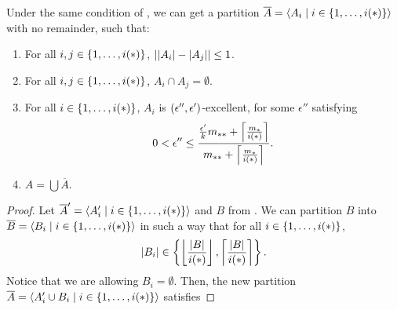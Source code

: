         \begin{lemma} \label{lem:existance_of_excellent_partition_with_equal_size_and_no_remainder}
            Under the same condition of , we can get a
            partition $\overline{A} = \left< A_i \mid i \in \{ 1, \dots, i(*) \} \right>$ with no remainder, such that:
            \begin{enumerate}[label={\Roman*}., ref={\Roman*}, font=\rmfamily]
                \item \label{itm:existance_of_excellent_partition_with_equal_size_and_no_remainder.a}
                    For all $i, j \in \{ 1, \dots, i(*) \}$, $| | A_i |- | A_j | | \leq 1$.
                \item \label{itm:existance_of_excellent_partition_with_equal_size_and_no_remainder.b}
                    For all $i, j \in \{ 1, \dots, i(*) \}$, $A_i \cap A_j = \emptyset$.
                \item \label{itm:existance_of_excellent_partition_with_equal_size_and_no_remainder.c}
                    For all $i \in \{ 1, \dots, i(*) \}$, $A_i$ is $( \epsilon'', \epsilon' )$-excellent, for some $\epsilon''$
                    satisfying
                    \[
                        0 < \epsilon'' \leq \frac{\frac{\epsilon'}{k} m_{**} + \left\lceil \frac{m_*}{i(*)} \right\rceil}{m_{**} + \left\lceil \frac{m_*}{i(*)} \right\rceil}.
                    \]
                \item \label{itm:existance_of_excellent_partition_with_equal_size_and_no_remainder.d} $A = \bigcup \overline{A}$.
            \end{enumerate}
            \begin{proof}
                Let $\overline{A}' = \left< A_i' \mid i \in \{ 1, \dots, i(*) \} \right>$ and $B$ from
                .
                \sloppy We can partition $B$ into \mbox{$\overline{B} = \left< B_i \mid i \in \{ 1, \dots, i(*) \} \right>$}
                in such a way that for all $i \in \{ 1, \dots, i(*) \}$,
                \[
                    |B_i| \in \left\{ \left\lfloor \frac{| B |}{i(*)} \right\rfloor, \left\lceil \frac{| B |}{i(*)} \right\rceil \right\}.
                \]
                Notice that we are allowing $B_i = \emptyset$.
                Then, the new partition $\overline{A} = \left< A_i' \cup B_i \mid i \in \{ 1, \dots, i(*) \} \right>$ satisfies

\end{proof}
\end{lemma}
